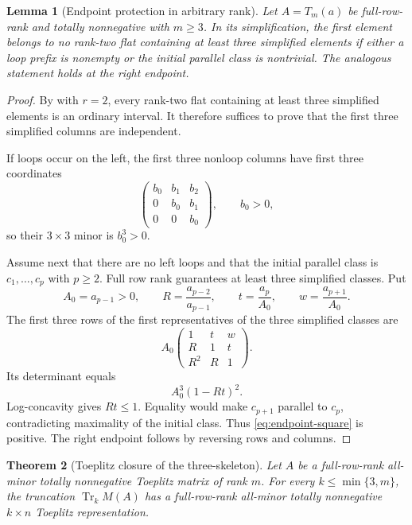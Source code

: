 \documentclass[11pt]{amsart}
\newtheorem{theorem}{Theorem}[section]
\newtheorem{lemma}[theorem]{Lemma}
\theoremstyle{definition}
\theoremstyle{remark}
\newcommand{\Tr}{\operatorname{Tr}}
\begin{document}
\begin{lemma}[Endpoint protection in arbitrary rank]\label{lem:endpoint-protection}
Let $A=T_m(a)$ be full-row-rank and totally nonnegative with $m\ge3$.  In its simplification, the first element belongs to no rank-two flat containing at least three simplified elements if either a loop prefix is nonempty or the initial parallel class is nontrivial.  The analogous statement holds at the right endpoint.
\end{lemma}

\begin{proof}
By  with $r=2$, every rank-two flat containing at least three simplified elements is an ordinary interval.  It therefore suffices to prove that the first three simplified columns are independent.

If loops occur on the left, the first three nonloop columns have first three coordinates
\[
 \begin{pmatrix}b_0&b_1&b_2\\0&b_0&b_1\\0&0&b_0\end{pmatrix},
 \qquad b_0>0,
\]
so their $3\times3$ minor is $b_0^3>0$.

Assume next that there are no left loops and that the initial parallel class is $c_1,\ldots,c_p$ with $p\ge2$.  Full row rank guarantees at least three simplified classes.  Put
\[
 A_0=a_{p-1}>0,
 \qquad R=\frac{a_{p-2}}{a_{p-1}},
 \qquad t=\frac{a_p}{A_0},
 \qquad w=\frac{a_{p+1}}{A_0}.
\]
The first three rows of the first representatives of the three simplified classes are
\[
 A_0
 \begin{pmatrix}
 1&t&w\\
 R&1&t\\
 R^2&R&1
 \end{pmatrix}.
\]
Its determinant equals
\begin{equation}\label{eq:endpoint-square}
 A_0^3(1-Rt)^2.
\end{equation}
Log-concavity gives $Rt\le1$.  Equality would make $c_{p+1}$ parallel to $c_p$, contradicting maximality of the initial class.  Thus \eqref{eq:endpoint-square} is positive.  The right endpoint follows by reversing rows and columns.
\end{proof}

\begin{theorem}[Toeplitz closure of the three-skeleton]\label{thm:tr3-closure}
Let $A$ be a full-row-rank all-minor totally nonnegative Toeplitz matrix of rank $m$.  For every $k\le\min\{3,m\}$, the truncation $\Tr_kM(A)$ has a full-row-rank all-minor totally nonnegative $k\times n$ Toeplitz representation.
\end{theorem}
\end{document}

